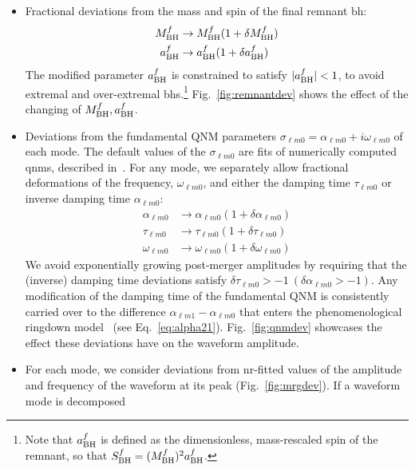 \documentclass[prd,amssymb,amsmath,amsfonts,nofootinbib,reprint,showpacs,longbibliography]{revtex4-1}
\def\mbhf{M_{\rm BH}^f}
\def\abhf{a_{\rm BH}^f}
\def\alphalm0{\alpha_{\ell m 0}}
\def\taulm0{\tau_{\ell m 0}}
\def\omegalm0{\omega_{\ell m 0}}
\begin{document}
\begin{itemize}
    \item Fractional deviations from the mass and spin of the final remnant \ac{bh}:
    \begin{subequations}
    \begin{align}
    \mbhf &\rightarrow \mbhf (1 + \delta \mbhf) \\
    \abhf &\rightarrow \abhf (1 + \delta \abhf)
    \end{align}
    \end{subequations}
    The modified parameter $\abhf$ is constrained to satisfy
    $|\abhf| < 1$, to avoid extremal and over-extremal \acp{bh}.\footnote{Note that $\abhf$ is defined
    as the dimensionless, mass-rescaled spin of the remnant, so that $S_{\rm BH}^{f} = (\mbhf)^2 \abhf$.}
    Fig.~\ref{fig:remnantdev} shows the effect of the changing of $\mbhf, \abhf$.
%
    \item Deviations from the fundamental QNM parameters $\sigma_{\ell m 0} = \alphalm0 + i \omegalm0$ of each
    mode. The default values of the $\sigma_{\ell m 0}$ are fits of numerically computed \acp{qnm},
    described in~\cite{Nagar:2019wds}. For any mode, we separately allow fractional deformations of the frequency,
    $\omegalm0$, and either the damping time $\taulm0$ or inverse damping time $\alphalm0$:
    \begin{subequations}
    \begin{align}
    \alphalm0 &\rightarrow \alphalm0 (1 + \delta \alphalm0) \\
    \taulm0   &\rightarrow \taulm0   (1 + \delta \taulm0) \\
    \omegalm0 &\rightarrow \omegalm0 (1 + \delta \omegalm0)
    \end{align}
    \end{subequations}
    We avoid exponentially growing post-merger amplitudes by requiring that the (inverse) damping time
    deviations satisfy $\delta \taulm0 > -1\  (\delta \alphalm0 > -1)$. Any modification of the damping time
    of the fundamental QNM is consistently carried over to the difference $\alpha_{\ell m 1} - \alphalm0$ 
    that enters the phenomenological ringdown model~\cite{Damour:2014sva,Nagar:2019wds,Nagar:2019pcj}
    (see Eq.~\eqref{eq:alpha21}). Fig.~\ref{fig:qnmdev} showcases the effect these deviations have on the
    waveform amplitude.
    \item For each mode, we consider deviations from \ac{nr}-fitted values of the amplitude and frequency of the
    waveform at its peak (Fig.~\ref{fig:mrgdev}). If a waveform mode is decomposed

\end{itemize}
\end{document}
